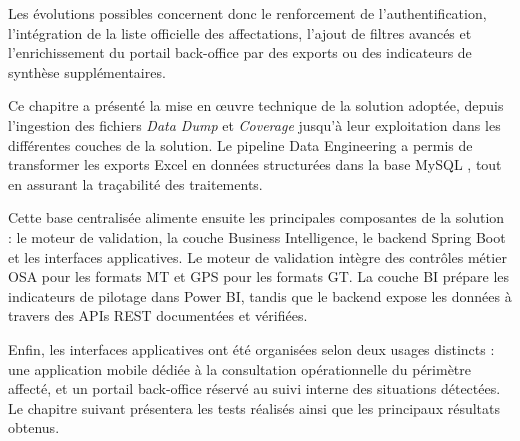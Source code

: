Les évolutions possibles concernent donc le renforcement de l’authentification, l’intégration de la liste officielle des affectations, l’ajout de filtres avancés et l’enrichissement du portail back-office par des exports ou des indicateurs de synthèse supplémentaires.

Ce chapitre a présenté la mise en œuvre technique de la solution adoptée, depuis l’ingestion des fichiers \textit{Data Dump} et \textit{Coverage} jusqu’à leur exploitation dans les différentes couches de la solution. Le pipeline Data Engineering a permis de transformer les exports Excel en données structurées dans la base MySQL , tout en assurant la traçabilité des traitements.

Cette base centralisée alimente ensuite les principales composantes de la solution : le moteur de validation, la couche Business Intelligence, le backend Spring Boot et les interfaces applicatives. Le moteur de validation intègre des contrôles métier OSA pour les formats MT et GPS pour les formats GT. La couche BI prépare les indicateurs de pilotage dans Power BI, tandis que le backend expose les données à travers des APIs REST documentées et vérifiées.

Enfin, les interfaces applicatives ont été organisées selon deux usages distincts : une application mobile dédiée à la consultation opérationnelle du périmètre affecté, et un portail back-office réservé au suivi interne des situations détectées. Le chapitre suivant présentera les tests réalisés ainsi que les principaux résultats obtenus.
